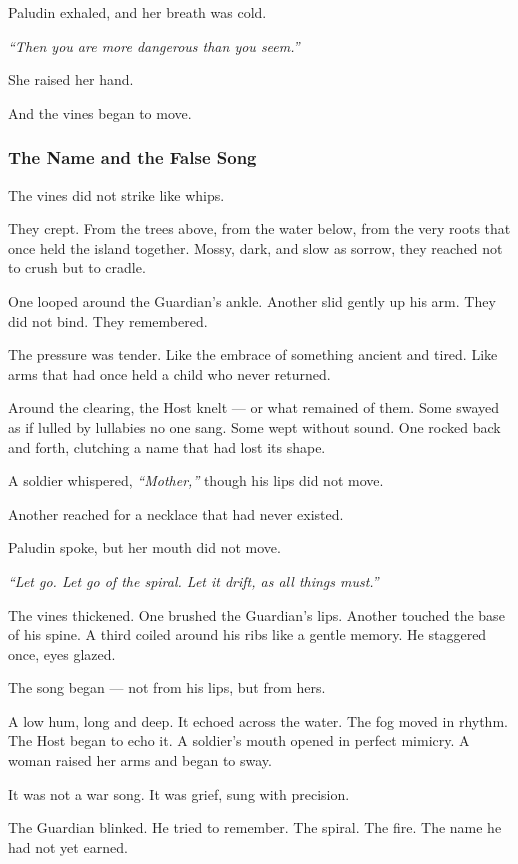 \documentclass[12pt]{article}
\begin{document}
Paludin exhaled, and her breath was cold.

\textit{``Then you are more dangerous than you seem.''}

She raised her hand.

And the vines began to move.

\dotfill

\subsubsection{The Name and the False Song}

The vines did not strike like whips.

They crept. From the trees above, from the water below, from the very roots that once held the island together. Mossy, dark, and slow as sorrow, they reached not to crush but to cradle.

One looped around the Guardian’s ankle. Another slid gently up his arm. They did not bind. They remembered.

The pressure was tender. Like the embrace of something ancient and tired. Like arms that had once held a child who never returned.

Around the clearing, the Host knelt — or what remained of them. Some swayed as if lulled by lullabies no one sang. Some wept without sound. One rocked back and forth, clutching a name that had lost its shape.

A soldier whispered, \textit{“Mother,”} though his lips did not move.

Another reached for a necklace that had never existed.

Paludin spoke, but her mouth did not move.

\textit{``Let go. Let go of the spiral. Let it drift, as all things must.''}

The vines thickened. One brushed the Guardian’s lips. Another touched the base of his spine. A third coiled around his ribs like a gentle memory. He staggered once, eyes glazed.

The song began — not from his lips, but from hers.

A low hum, long and deep. It echoed across the water. The fog moved in rhythm. The Host began to echo it. A soldier’s mouth opened in perfect mimicry. A woman raised her arms and began to sway.

It was not a war song. It was grief, sung with precision.

The Guardian blinked. He tried to remember. The spiral. The fire. The name he had not yet earned.
\end{document}
